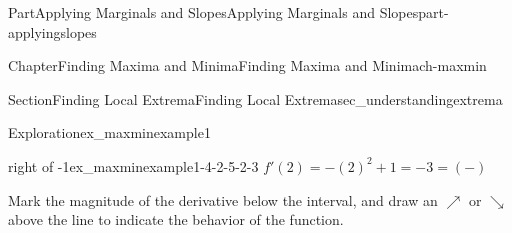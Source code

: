 \documentclass{tufte-book}
\numberwithin{equation}{chapter}
\begin{document}
\begin{partptx}{Part}{Applying Marginals and Slopes}{}{Applying Marginals and Slopes}{}{}{part-applyingslopes}
\begin{chapterptx}{Chapter}{Finding Maxima and Minima}{}{Finding Maxima and Minima}{}{}{ch-maxmin}
\begin{sectionptx}{Section}{Finding Local Extrema}{}{Finding Local Extrema}{}{}{sec_understandingextrema}
\begin{exploration}{Exploration}{}{ex_maxminexample1}
\begin{enumerate}[font=\bfseries,label=(\alph*),ref=\alph*]
\begin{descriptionlist}
\begin{dlimedium}{right of -1}{ex_maxminexample1-4-2-5-2-3}
 \(f'(2) = -(2)^2 + 1 = -3 = (-)\)\end{dlimedium}%
\end{descriptionlist}
Mark the magnitude of the derivative below the interval, and draw an \(\nearrow\) or \(\searrow\) above the line to indicate the behavior of the function.%
\par
\begin{image}{0.25}{0.5}{0.25}{}%
\end{image}
\end{enumerate}
\end{exploration}
\end{sectionptx}
\end{chapterptx}
\end{partptx}
\end{document}
